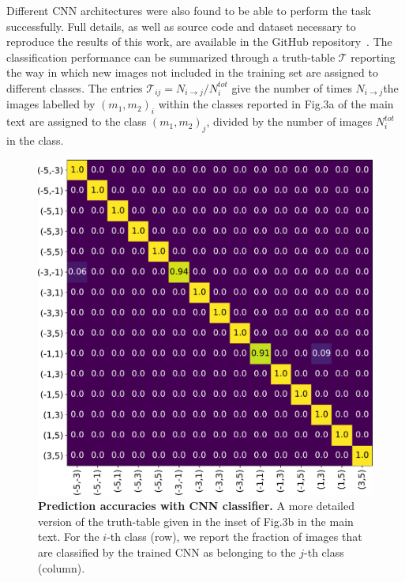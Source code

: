 \documentclass[
    floatfix, aps, pra, superscriptaddress,
	10pt, twocolumn,
    nofootinbib,
	tightenlines
]{revtex4-1}
\begin{document}
Different CNN architectures were also found to be able to perform the task successfully.
Full details, as well as source code and dataset necessary to reproduce the results of this work, are available in the GitHub repository~\cite{github}.
The classification performance can be summarized through a truth-table $\mathcal{T}$ reporting the way in which new images not included in the training set are assigned to different classes. The entries $\mathcal{T}_{ij}={N_{i\rightarrow{j}}}/{N^{tot}_{i}}$ give the number of times $N_{i\rightarrow{j}}$the images labelled by $(m_{1},m_{2})_i$ within the classes reported in Fig.3a of the main text are assigned to the class $(m_{1},m_{2})_j$, divided by the number of images $N^{tot}_{i}$ in the class. %
\begin{figure}[t]
    \centering
    \includegraphics[width=\columnwidth]{truth_table_CNN.pdf}
    \caption{
        \textbf{Prediction accuracies with CNN classifier.}
        A more detailed version of the truth-table given in the inset of Fig.3b in the main text.
        For the $i$-th class (row), we report the fraction of images that are classified by the trained CNN as belonging to the $j$-th class (column).
    }
    \label{si_fig:truth_CNN}
\end{figure}
\end{document}
